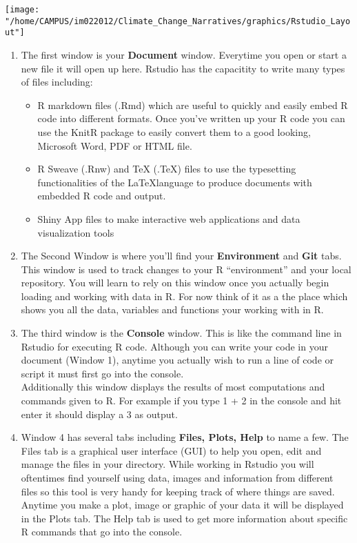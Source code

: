\documentclass{article}\usepackage[]{graphicx}\usepackage[]{color}
\begin{document}
\texttt{[image: "/home/CAMPUS/im022012/Climate\_Change\_Narratives/graphics/Rstudio\_Layout"]}
  \begin{enumerate}
  \item The first window is your \textbf{Document} window. Everytime you open or start a new file it will open up here. Rstudio has the capacitity to write many types of files including: 
  \begin{itemize}
  \item R markdown files (.Rmd) which are useful to quickly and easily embed R code into different formats. Once you've written up your R code you can use the KnitR package to easily convert them to a good looking, Microsoft Word, PDF or HTML file. 
  \item R Sweave (.Rnw) and TeX (.TeX) files to use the typesetting functionalities of the \LaTeX language to produce documents with embedded R code and output. 
  \item Shiny App files to make interactive web applications and data visualization tools
  \end{itemize}
  \item The Second Window is where you'll find your \textbf{Environment} and \textbf{Git} tabs. This window is used to track changes to your R ``environment'' and your local repository. You will learn to rely on this window once you actually begin loading and working with data in R. For now think of it as a the place which shows you all the data, variables and functions your working with in R. 
  \item The third window is the \textbf{Console} window. This is like the command line in Rstudio for executing R code. Although you can write your code in your document (Window 1), anytime you actually wish to run a line of code or script it must first go into the console.\\
  Additionally this window displays the results of most computations and commands given to R. For example if you type 1 + 2 in the console and hit enter it should display a 3 as output.   
  \item Window 4 has several tabs including \textbf{Files, Plots, Help} to name a few. The Files tab is a graphical user interface (GUI) to help you open, edit and manage the files in your directory. While working in Rstudio you will oftentimes find yourself using data, images and information from different files so this tool is very handy for keeping track of where things are saved. \\
  Anytime you make a plot, image or graphic of your data it will be displayed in the Plots tab. The Help tab is used to get more information about specific R commands that go into the console. \\
  \end{enumerate}
  
\end{document}
